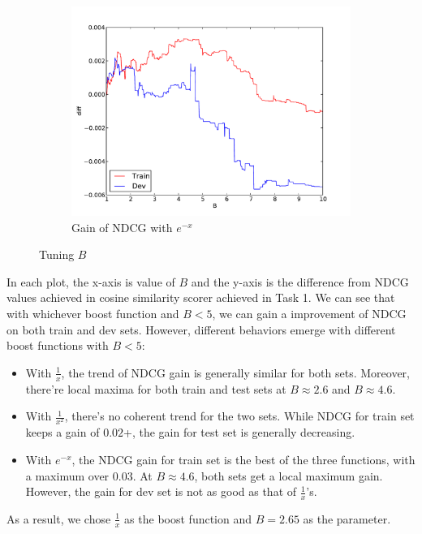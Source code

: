 \documentclass{article}
\begin{document}
\begin{figure}[!htb]
\begin{subfigure}{.3333\textwidth}
      \includegraphics[width=\linewidth]{sw-exp.pdf}
      \caption{Gain of NDCG with $e^{-x}$}
      \label{fig:diff-exp}
  \end{subfigure}
  \caption{Tuning $B$}
  \label{fig:tune-b}
\end{figure}

In each plot, the x-axis is value of $B$ and the y-axis is the difference from NDCG values achieved in cosine similarity scorer achieved in Task 1. We can see that with whichever boost function and $B<5$, we can gain a improvement of NDCG on both train and dev sets. However, different behaviors emerge with different boost functions with $B<5$:

\begin{itemize}
    \item With $\frac{1}{x}$, the trend of NDCG gain is generally similar for both sets. Moreover, there're local maxima for both train and test sets at $B\approx 2.6$ and $B\approx 4.6$.
    \item With $\frac{1}{x^2}$, there's no coherent trend for the two sets. While NDCG for train set keeps a gain of $0.02$+, the gain for test set is generally decreasing.
    \item With $e^{-x}$, the NDCG gain for train set is the best of the three functions, with a maximum over 0.03. At $B\approx 4.6$, both sets get a local maximum gain. However, the gain for dev set is not as good as that of $\frac{1}{x}$'s.
\end{itemize}

As a result, we chose $\frac{1}{x}$ as the boost function and $B=2.65$ as the parameter.
\end{document}
